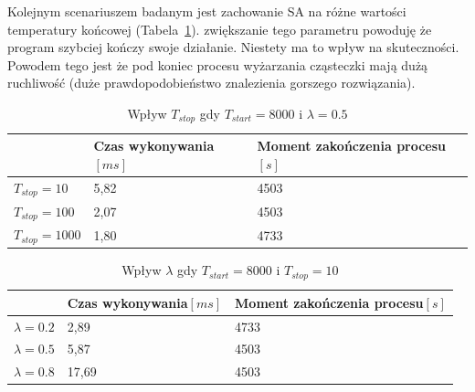 \newpage
Kolejnym scenariuszem badanym jest zachowanie SA na różne wartości temperatury końcowej (Tabela~\ref{tstop_sa}). zwiększanie tego parametru powoduję że program  szybciej kończy swoje działanie. Niestety ma to wpływ na skuteczności. Powodem tego jest że pod koniec procesu wyżarzania cząsteczki mają dużą ruchliwość (duże prawdopodobieństwo znalezienia gorszego rozwiązania).
\begin{table}[H]
	\centering
	\label{tstop_sa}
	\caption{Wpływ $T_{stop}$ gdy $T_{start}=8000$ i $\lambda=0.5$}
	\begin{tabular}{lll}
		\toprule
		                & Czas wykonywania$[ms]$ & Moment zakończenia procesu$[s]$ \\
		\midrule
		$T_{stop}=10$   & 5,82                   & 4503                             \\
		$T_{stop}=100$  & 2,07                   & 4503                             \\
		$T_{stop}=1000$ & 1,80                   & 4733                             \\
		\bottomrule
	\end{tabular}
\end{table}


\begin{table}[H]
	\centering
	\caption{Wpływ $\lambda$ gdy $T_{start}=8000$ i $T_{stop}=10$}
	\begin{tabular}{lll}
		\toprule
		              & Czas wykonywania$[ms]$ & Moment zakończenia procesu$[s]$ \\
		\midrule
		$\lambda=0.2$ & 2,89                   & 4733                             \\
		$\lambda=0.5$ & 5,87                   & 4503                             \\
		$\lambda=0.8$ & 17,69                  & 4503                             \\
		\bottomrule
	\end{tabular}
\end{table}